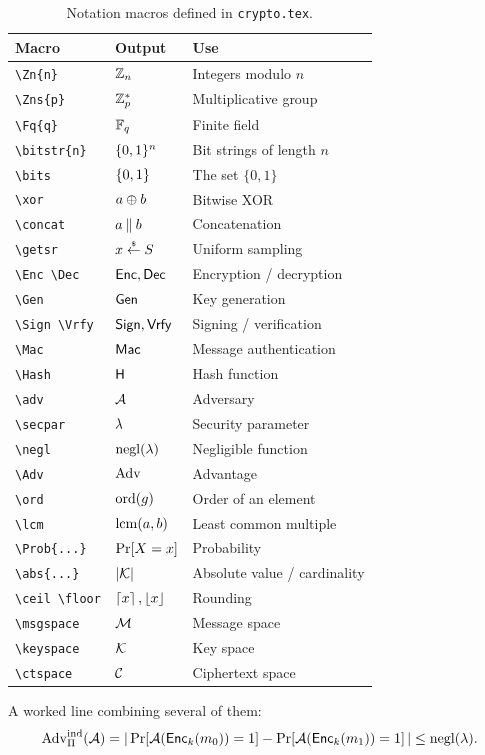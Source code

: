 \documentclass[11pt,a4paper]{article}
\begin{document}
\begin{table}[H]
    \centering
    \caption{Notation macros defined in \texttt{crypto.tex}.}
    \label{tab:macros}
    \begin{tabular}{@{}llp{7.2cm}@{}}
        \toprule
        \textbf{Macro} & \textbf{Output} & \textbf{Use} \\
        \midrule
        \verb|\Zn{n}|      & $\mathbb{Z}_{n}$      & Integers modulo $n$ \\
        \verb|\Zns{p}|     & $\mathbb{Z}_{p}^{*}$     & Multiplicative group \\
        \verb|\Fq{q}|      & $\mathbb{F}_{q}$      & Finite field \\
        \verb|\bitstr{n}|  & $\{0,1\}^{n}$  & Bit strings of length $n$ \\
        \verb|\bits|       & $\{0,1\}$       & The set $\{0,1\}$ \\
        \verb|\xor|        & $a \oplus b$    & Bitwise XOR \\
        \verb|\concat|     & $a \mathbin\Vert b$ & Concatenation \\
        \verb|\getsr|      & $x \stackrel{\scriptscriptstyle\$}{\leftarrow} S$  & Uniform sampling \\
        \verb|\Enc \Dec|   & $\mathsf{Enc},\mathsf{Dec}$   & Encryption / decryption \\
        \verb|\Gen|        & $\mathsf{Gen}$        & Key generation \\
        \verb|\Sign \Vrfy| & $\mathsf{Sign},\mathsf{Vrfy}$ & Signing / verification \\
        \verb|\Mac|        & $\mathsf{Mac}$        & Message authentication \\
        \verb|\Hash|       & $\mathsf{H}$       & Hash function \\
        \verb|\adv|        & $\mathcal{A}$        & Adversary \\
        \verb|\secpar|     & $\lambda$     & Security parameter \\
        \verb|\negl|       & $\operatorname{negl}(\lambda)$ & Negligible function \\
        \verb|\Adv|        & $\operatorname{Adv}$        & Advantage \\
        \verb|\ord|        & $\operatorname{ord}(g)$     & Order of an element \\
        \verb|\lcm|        & $\operatorname{lcm}(a,b)$   & Least common multiple \\
        \verb|\Prob{...}|  & $\Pr\!\left[ X = x \right]$ & Probability \\
        \verb|\abs{...}|   & $\left\lvert \mathcal{K} \right\rvert$ & Absolute value / cardinality \\
        \verb|\ceil \floor|& $\left\lceil x \right\rceil, \left\lfloor x \right\rfloor$ & Rounding \\
        \verb|\msgspace|   & $\mathcal{M}$   & Message space \\
        \verb|\keyspace|   & $\mathcal{K}$   & Key space \\
        \verb|\ctspace|    & $\mathcal{C}$    & Ciphertext space \\
        \bottomrule
    \end{tabular}
\end{table}

A worked line combining several of them:
\begin{equation}
    \operatorname{Adv}^{\mathrm{ind}}_{\Pi}(\mathcal{A})
    = \left\lvert \, \Pr\!\left[ \mathcal{A}(\mathsf{Enc}_k(m_0)) = 1 \right] - \Pr\!\left[ \mathcal{A}(\mathsf{Enc}_k(m_1)) = 1 \right] \, \right\rvert
    \leq \operatorname{negl}(\lambda).
    \label{eq:advantage}
\end{equation}
\end{document}
